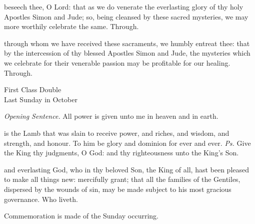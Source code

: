 
\secret
{} beseech thee, O Lord: that as we do venerate the everlasting glory of thy holy Apostles Simon and Jude; so, being cleansed by these sacred mysteries, we may more worthily celebrate the same. Through.


\postcommunion
{} through whom we have received these sacraments, we humbly entreat thee: that by the intercession of thy blessed Apostles Simon and Jude, the mysteries which we celebrate for their venerable passion may be profitable for our healing. Through.


\clearpage
{}
\begin{inhead}
    {First Class Double\\
Last Sunday in October}
\end{inhead}
\fancyhead[RE,LO]{}
\par\noindent
\textit{Opening Sentence.} All power is given unto me in heaven and in earth.

\introit
{} is the Lamb that was slain to receive power, and riches, and wisdom, and strength, and honour. To him be glory and dominion for ever and ever. \textit{Ps.} Give the King thy judgments, O God: and thy righteousness unto the King's Son.

\collect
{} and everlasting God, who in thy beloved Son, the King of all, hast been pleased to make all things new: mercifully grant; that all the families of the Gentiles, dispersed by the wounds of sin, may be made subject to his most gracious governance. Who liveth.
\begin{rubric}
    Commemoration is made of the Sunday occurring.
\end{rubric}

